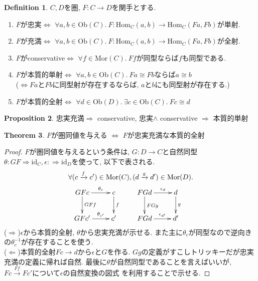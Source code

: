 \documentclass[a4paper,10pt]{article}
\theoremstyle{definition}
\newtheorem{thm}{\bfseries Theorem}[section]
\newtheorem{definition}[thm]{\bfseries Definition}
\newtheorem{prop}[thm]{\bfseries Proposition} %
\begin{document}
\begin{definition}
    $C, D$を圏, $F:C \rightarrow D$を関手とする. 
    \begin{enumerate}[(1)]
        \item $F$が忠実$\Longleftrightarrow$ 
        $\forall a,b \in \mathrm{Ob}(C).\  
        F: \mathrm{Hom}_C(a,b) \rightarrow \mathrm{Hom}_C(Fa,Fb)$が単射.
        \item $F$が充満$\Longleftrightarrow$ 
        $\forall a,b \in \mathrm{Ob}(C).\  
        F: \mathrm{Hom}_C(a,b) \rightarrow \mathrm{Hom}_C(Fa,Fb)$が全射.
        \item $F$がconservative$\Longleftrightarrow$ 
        $\forall f \in \mathrm{Mor}(C).\  
        Ff \text{が同型ならば} f \text{も同型である}$.
        \item $F$が本質的単射$\Longleftrightarrow$ 
        $\forall a, b \in \mathrm{Ob}(C).\  
        Fa \cong Fb \text{ならば} a \cong b$ \\
        ($\Longleftrightarrow Fa\text{と}Fb\text{に同型射が存在するならば, }
        a\text{と}b\text{にも同型射が存在する.}$)
        \item $F$が本質的全射$\Longleftrightarrow$ 
        $\forall d \in \mathrm{Ob}(D).\  
        \exists c \in \mathrm{Ob}(C).\ Fc \cong d$
    \end{enumerate}
\end{definition}
\begin{prop}
        忠実充満$\Longrightarrow$ conservative, 
        忠実$\land$ conservative $\Longrightarrow$ 本質的単射
\end{prop}
\begin{thm}
    \label{faithful}
    $F$が圏同値を与える $\Longleftrightarrow$
    $F$が忠実充満な本質的全射
\end{thm}
\begin{proof}
    $F$が圏同値を与えるという条件は, 
    $G: D \rightarrow C$と自然同型$\theta: GF \Rightarrow \mathrm{id}_C, \epsilon:
    \Rightarrow \mathrm{id}_D$を使って, 以下で表される. 
\begin{align*}
    \forall& (c \xrightarrow{f} c') \in \mathrm{Mor}(C), 
    (d \xrightarrow{g} d') \in \mathrm{Mor}(D).\\
&\xymatrix{
GFc \ar[r]^-{\theta_c} \ar[d]^-{GFf} & c \ar[d]^-{f}& 
FGd\ar[r]^-{\epsilon_d} \ar[d]^{FGg} & d \ar[d]^-{g} \\
GFc' \ar[r]^-{\theta_{c'}}& c' 
& FGd\ar[r]^-{\epsilon_{d'}}& d'
}
    \end{align*}
($\Longrightarrow$)$\epsilon$から本質的全射, $\theta$から忠実充満が示せる.
また主に$\theta_c$が同型なので逆向きの$\theta_c^{-1}$が存在することを使う.\\
($\Longleftarrow$)本質的全射$Fc \rightarrow d$から$\epsilon$と$G$を作る. 
$Gg$の定義がすこしトリッキーだが忠実充満の定義に帰れば自然. 
最後に$\theta$が自然同型であることを言えばいいが, $Fc \xrightarrow{Ff} Fc'$について$\epsilon$の自然変換の図式
を利用することで示せる. 

\end{proof}
\end{document}
